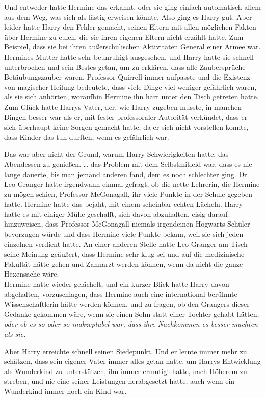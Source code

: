 {Und entweder hatte Hermine das erkannt, oder sie ging einfach automatisch allem aus dem Weg, was sich als lästig erweisen könnte. Also ging es Harry gut. Aber leider hatte Harry den Fehler gemacht, seinen Eltern mit allen möglichen Fakten über Hermine zu eulen, die sie ihren eigenen Eltern nicht erzählt hatte. Zum Beispiel, dass sie bei ihren außerschulischen Aktivitäten General einer Armee war. Hermines Mutter hatte sehr beunruhigt ausgesehen, und Harry hatte sie schnell unterbrochen und sein Bestes getan, um zu erklären, dass alle Zaubersprüche Betäubungszauber waren, Professor Quirrell immer aufpasste und die Existenz von magischer Heilung bedeutete, dass viele Dinge viel weniger gefährlich waren, als sie sich anhörten, woraufhin Hermine ihn hart unter den Tisch getreten hatte. Zum Glück hatte Harrys Vater, der, wie Harry zugeben musste, in manchen Dingen besser war als er, mit fester professoraler Autorität verkündet, dass er sich überhaupt keine Sorgen gemacht hatte, da er sich nicht vorstellen konnte, dass Kinder das tun durften, wenn es gefährlich war.

Das war aber nicht der Grund, warum Harry Schwierigkeiten hatte, das Abendessen zu genießen. … das Problem mit dem Selbstmitleid war, dass es nie lange dauerte, bis man jemand anderen fand, dem es noch schlechter ging. Dr. Leo Granger hatte irgendwann einmal gefragt, ob die nette Lehrerin, die Hermine zu mögen schien, Professor McGonagall, ihr viele Punkte in der Schule gegeben hatte. Hermine hatte das bejaht, mit einem scheinbar echten Lächeln. Harry hatte es mit einiger Mühe geschafft, sich davon abzuhalten, eisig darauf hinzuweisen, dass Professor McGonagall niemals irgendeinen Hogwarts-Schüler bevorzugen würde und dass Hermine viele Punkte bekam, weil sie sich jeden einzelnen verdient hatte. An einer anderen Stelle hatte Leo Granger am Tisch seine Meinung geäußert, dass Hermine sehr klug sei und auf die medizinische Fakultät hätte gehen und Zahnarzt werden können, wenn da nicht die ganze Hexensache wäre.\\ Hermine hatte wieder gelächelt, und ein kurzer Blick hatte Harry davon abgehalten, vorzuschlagen, dass Hermine auch eine international berühmte Wissenschaftlerin hätte werden können, und zu fragen, ob den Grangers dieser Gedanke gekommen wäre, wenn sie einen Sohn statt einer Tochter gehabt hätten, \emph{oder ob es so oder so inakzeptabel war, dass ihre Nachkommen es besser machten als sie.}

Aber Harry erreichte schnell seinen Siedepunkt. Und er lernte immer mehr zu schätzen, dass sein eigener Vater immer alles getan hatte, um Harrys Entwicklung als Wunderkind zu unterstützen, ihn immer ermutigt hatte, nach Höherem zu streben, und nie eine seiner Leistungen herabgesetzt hatte, auch wenn ein Wunderkind immer noch ein Kind war.

}
